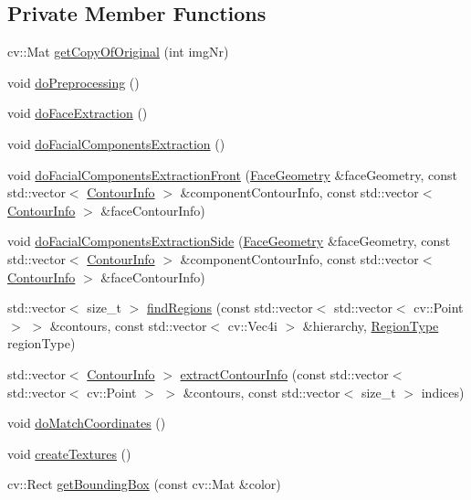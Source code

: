 \subsection*{Private Member Functions}
\begin{DoxyCompactItemize}
\item 
cv\+::\+Mat \hyperlink{class_face3_d_1_1_detection_ad151547c47b89dc4673c51c43e22b6d3}{get\+Copy\+Of\+Original} (int img\+Nr)
\item 
void \hyperlink{class_face3_d_1_1_detection_a0b4b0034dd25890ac492854d825c3ea1}{do\+Preprocessing} ()
\item 
void \hyperlink{class_face3_d_1_1_detection_a424c3fba1ee4b7d24a84edebca9ecf14}{do\+Face\+Extraction} ()
\item 
void \hyperlink{class_face3_d_1_1_detection_a2345b11759e84ca94409cb65cef557f3}{do\+Facial\+Components\+Extraction} ()
\item 
void \hyperlink{class_face3_d_1_1_detection_aeca140a4cb5eb2d035afabd66b90b42c}{do\+Facial\+Components\+Extraction\+Front} (\hyperlink{class_face3_d_1_1_face_geometry}{Face\+Geometry} \&face\+Geometry, const std\+::vector$<$ \hyperlink{struct_face3_d_1_1_detection_1_1_contour_info}{Contour\+Info} $>$ \&component\+Contour\+Info, const std\+::vector$<$ \hyperlink{struct_face3_d_1_1_detection_1_1_contour_info}{Contour\+Info} $>$ \&face\+Contour\+Info)
\item 
void \hyperlink{class_face3_d_1_1_detection_ae630778f107162e95580608fcb87aedc}{do\+Facial\+Components\+Extraction\+Side} (\hyperlink{class_face3_d_1_1_face_geometry}{Face\+Geometry} \&face\+Geometry, const std\+::vector$<$ \hyperlink{struct_face3_d_1_1_detection_1_1_contour_info}{Contour\+Info} $>$ \&component\+Contour\+Info, const std\+::vector$<$ \hyperlink{struct_face3_d_1_1_detection_1_1_contour_info}{Contour\+Info} $>$ \&face\+Contour\+Info)
\item 
std\+::vector$<$ size\+\_\+t $>$ \hyperlink{class_face3_d_1_1_detection_a2685b94451caa0572d6d209c936160b4}{find\+Regions} (const std\+::vector$<$ std\+::vector$<$ cv\+::\+Point $>$ $>$ \&contours, const std\+::vector$<$ cv\+::\+Vec4i $>$ \&hierarchy, \hyperlink{class_face3_d_1_1_detection_a8db79da2a4506aa0e799e4ff098d7d62}{Region\+Type} region\+Type)
\item 
std\+::vector$<$ \hyperlink{struct_face3_d_1_1_detection_1_1_contour_info}{Contour\+Info} $>$ \hyperlink{class_face3_d_1_1_detection_ae9ca9a340a1f81db0fa240045da86017}{extract\+Contour\+Info} (const std\+::vector$<$ std\+::vector$<$ cv\+::\+Point $>$ $>$ \&contours, const std\+::vector$<$ size\+\_\+t $>$ indices)
\item 
void \hyperlink{class_face3_d_1_1_detection_a0cf36050ade66d18074b6fa78ee7c7ca}{do\+Match\+Coordinates} ()
\item 
void \hyperlink{class_face3_d_1_1_detection_a7a6c141eb4ecee4385a84b541275f1df}{create\+Textures} ()
\item 
cv\+::\+Rect \hyperlink{class_face3_d_1_1_detection_ac4cc64a1037a3e09f8e7b8016528bafd}{get\+Bounding\+Box} (const cv\+::\+Mat \&color)
\end{DoxyCompactItemize}
